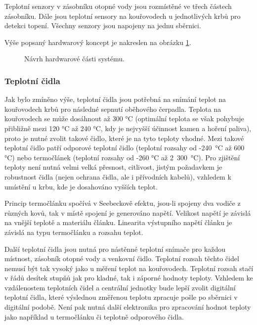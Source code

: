 Teplotní senzory v zásobníku otopné vody jsou rozmístěné ve třech částech zásobníku. Dále jsou teplotní sensory na kouřovodech u jednotlivých krbů pro detekci topení. Všechny senzory jsou napojeny na jednu sběrnici.

Výše popsaný hardwarový koncept je nakreslen na obrázku \ref{fig:navrh-hardwarove-casti}.

\begin{figure}[H]
    \centering
    \def\svgwidth{\columnwidth}
    
    \caption{ Návrh hardwarové části systému.}
    \label{fig:navrh-hardwarove-casti}
\end{figure}

\subsubsection{Teplotní čidla}
Jak bylo zmíněno výše, teplotní čidla jsou potřebná na snímání teplot na kouřovodech krbů pro následné sepnutí oběhového čerpadla. Teplota na kouřovodech se může dosáhnout až 300 °C (optimální teplota se však pohybuje přibližně mezi 120 °C až 240 °C, kdy je nejvyšší účinnost kamen a hoření paliva), proto je nutné zvolit takové čidlo, které je na tyto teploty vhodné. Mezi takové teplotní čidlo patří odporové teplotní čidlo (teplotní rozsahy od -240~°C až 600 °C) nebo termočlánek (teplotní rozsahy od -260 °C až 2~300~°C). Pro zjištění teploty není nutná velmi velká přesnost, citlivost, jistým požadavkem je robustnost čidla (nejen ochrana čidla, ale i přívodních kabelů), vzhledem k umístění u krbu, kde je dosahováno vyšších teplot.

Princip termočlánku spočívá v Seebeckově efektu, jsou-li spojeny dva vodiče z různých kovů, tak v místě spojení je generováno napětí. Velikost napětí je závislá na vnější teplotě a materiálu článku. Linearita výstupního napětí článku je závislá na typu termočlánku a rozsahu teplot.

Další teplotní čidla jsou nutná pro nástěnné teplotní snímače pro každou místnost, zásobník otopné vody a venkovní čidlo. Teplotní rozsah těchto čidel nemusí být tak vysoký jako u měření teplot na kouřovodech. Teplotní rozsah stačí v řádů desítek stupňů jak pro kladné, tak i záporné hodnoty teploty. Vzhledem ke vzdálenostem teplotních čidel a centrální jednotky bude lepší zvolit digitální teplotní čidla, které výslednou změřenou teplotu zpracuje pošle po sběrnici v digitální podobě. Není pak nutná další elektronika pro zpracování hodnot teploty jako například u termočlánku či teplotně odporového čidla.

